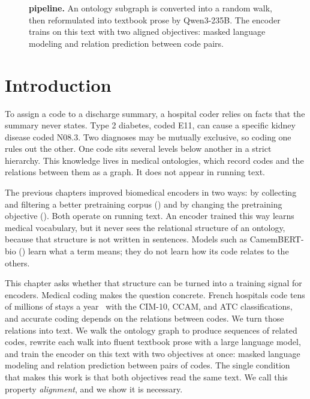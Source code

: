 \begin{figure}[t]
\caption{\textbf{\method pipeline.} An ontology subgraph is converted into a random walk, then reformulated into textbook prose by Qwen3-235B. The encoder trains on this text with two aligned objectives: masked language modeling and relation prediction between code pairs.}
\label{fig:ontobook-pipeline}
\end{figure}

\section{Introduction}
\label{sec:intro}

To assign a code to a discharge summary, a hospital coder relies on facts that the summary never states. Type 2 diabetes, coded E11, can cause a specific kidney disease coded N08.3. Two diagnoses may be mutually exclusive, so coding one rules out the other. One code sits several levels below another in a strict hierarchy. This knowledge lives in medical ontologies, which record codes and the relations between them as a graph. It does not appear in running text.

The previous chapters improved biomedical encoders in two ways: by collecting and filtering a better pretraining corpus () and by changing the pretraining objective (). Both operate on running text. An encoder trained this way learns medical vocabulary, but it never sees the relational structure of an ontology, because that structure is not written in sentences. Models such as CamemBERT-bio () learn what a term means; they do not learn how its code relates to the others.

This chapter asks whether that structure can be turned into a training signal for encoders. Medical coding makes the question concrete. French hospitals code tens of millions of stays a year~\citep{atih_pmsi} with the CIM-10, CCAM, and ATC classifications, and accurate coding depends on the relations between codes.
We turn those relations into text. We walk the ontology graph to produce sequences of related codes, rewrite each walk into fluent textbook prose with a large language model, and train the encoder on this text with two objectives at once: masked language modeling and relation prediction between pairs of codes. The single condition that makes this work is that both objectives read the same text. We call this property \emph{alignment}, and we show it is necessary.

